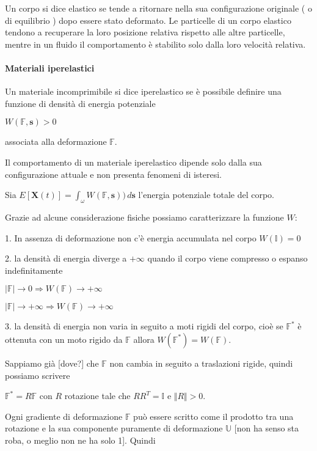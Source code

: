 Un corpo si dice elastico se tende a ritornare nella sua configurazione originale ( o di equilibrio ) dopo essere stato deformato. Le particelle di un corpo elastico tendono a recuperare la loro posizione relativa rispetto alle altre particelle, mentre in un fluido il comportamento è stabilito solo dalla loro velocità relativa.

\paragraph{Materiali iperelastici}

Un materiale incomprimibile si dice iperelastico se è possibile definire una funzione di densità di energia potenziale

$W( \mathbb{F},\mathbf{s}) > 0$

associata alla deformazione $\mathbb{F}$.

Il comportamento di un materiale iperelastico dipende solo dalla sua configurazione attuale e non presenta fenomeni di isteresi.

Sia $E [  \mathbf{X}(t) ] = \int_{\omega} W( \mathbb{F}, \mathbf{s} )) \, d\mathbf{s}$ l'energia potenziale totale del corpo.

Grazie ad alcune considerazione fisiche possiamo caratterizzare la funzione $W$:

1. In assenza di deformazione non c'è energia accumulata nel corpo $W(\mathbb{I}) = 0$

2. la densità di energia diverge a $+\infty$ quando il corpo viene compresso o espanso indefinitamente  

$\vert \mathbb{F} \vert \rightarrow 0 \Rightarrow W(\mathbb{F}) \rightarrow +\infty$

$\vert \mathbb{F} \vert \rightarrow +\infty \Rightarrow W(\mathbb{F}) \rightarrow +\infty$

3.  la densità di energia non varia in seguito a moti rigidi del corpo, cioè se $\mathbb{F}^*$ è ottenuta con un moto rigido da $\mathbb{F}$ allora $W(\mathbb{F}^*) = W(\mathbb{F})$.

Sappiamo già [dove?] che $\mathbb{F}$ non cambia in seguito a traslazioni rigide, quindi possiamo scrivere

$\mathbb{F}^* = R\mathbb{F}$ con $R$ rotazione tale che $RR^T = \mathbb{I}$ e $\Vert R \Vert > 0$.

Ogni gradiente di deformazione $\mathbb{F}$ può essere scritto come il prodotto tra una rotazione e la sua componente puramente di deformazione $\mathbb{U}$ [non ha senso sta roba, o meglio non ne ha solo 1]. Quindi

